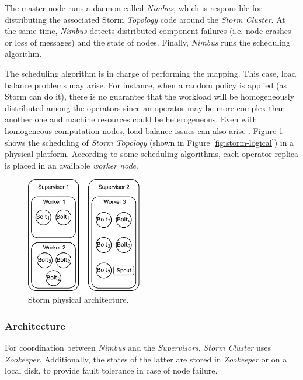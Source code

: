 The master node runs a daemon called \textit{Nimbus}, which is responsible for distributing the associated Storm \textit{Topology} code around the \textit{Storm Cluster}. At the same time, \textit{Nimbus} detects distributed component failures (i.e. node crashes or loss of messages) and the state of nodes. Finally, \textit{Nimbus} runs the scheduling algorithm.

The scheduling algorithm is in charge of performing the mapping. This case, load balance problems may arise. For instance, when a random policy is applied (as Storm can do it), there is no guarantee that the workload will be homogeneously distributed among the operators since an operator may be more complex than another one \cite{XingZH05} and machine resources could be heterogeneous.  Even with homogeneous computation nodes, load balance issues can also arise \cite{XuCTS14}. 
Figure \ref{fig:storm-physical} shows the scheduling of \textit{Storm Topology} (shown in Figure \ref{fig:storm-logical}) in a physical platform. According to some scheduling algorithms, each operator replica is placed in an available \textit{worker node}.

\begin{figure}[!ht]
     \centering
     \includegraphics[width=0.45\textwidth]{figures/concepts/Storm-Physical.pdf}
     \caption{Storm physical architecture.}
     \label{fig:storm-physical}
\end{figure}

\subsubsection{Architecture}

For coordination between \textit{Nimbus} and the \textit{Supervisors}, \textit{Storm Cluster} uses \textit{Zookeeper}. Additionally, the states of the latter are stored in \textit{Zookeeper} or on a local disk, to provide fault tolerance in case of node failure.

